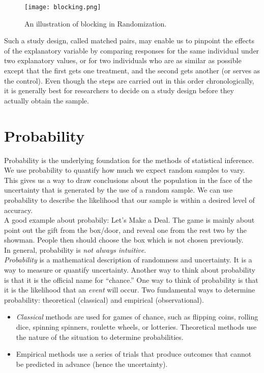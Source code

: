 \documentclass[10pt, a4paper]{article}
\begin{document}
\begin{figure}
[h!]
\centering
\texttt{[image: blocking.png]}
\caption{An illustration of blocking in Randomization.}
\end{figure}
Such a study design, called matched pairs, may enable us to pinpoint the effects of the explanatory variable by comparing responses for the same individual under two explanatory values, or for two individuals who are as similar as possible except that the first gets one treatment, and the second gets another (or serves as the control). Even though the steps are carried out in this order chronologically, it is generally best for researchers to decide on a study design before they actually obtain the sample. \\ 

\section{Probability}
Probability is the underlying foundation for the methods of statistical inference. We use probability to quantify how much we expect random samples to vary. This gives us a way to draw conclusions about the population in the face of the uncertainty that is generated by the use of a random sample. We can use probability to describe the likelihood that our sample is within a desired level of accuracy. \\
A good example about probabily: Let's Make a Deal. The game is mainly about point out the gift from the box/door, and reveal one from the rest two by the showman. People then should choose the box which is not chosen previously.\\
In general, probability is \emph{not always intuitive}.\\
\emph{Probability} is a mathematical description of randomness and uncertainty. It is a way to measure or quantify uncertainty. Another way to think about probability is that it is the official name for ``chance.'' One way to think of probability is that it is the likelihood that an \emph{event} will occur.
Two fundamental ways to determine probability: theoretical (classical) and empirical (observational). 
\begin{itemize}
\item \emph{Classical} methods are used for games of chance, such as flipping coins, rolling dice, spinning spinners, roulette wheels, or lotteries.
Theoretical methods use the nature of the situation to determine probabilities.
\item Empirical methods use a series of trials that produce outcomes that cannot be predicted in advance (hence the uncertainty).
\end{itemize}
\end{document}
